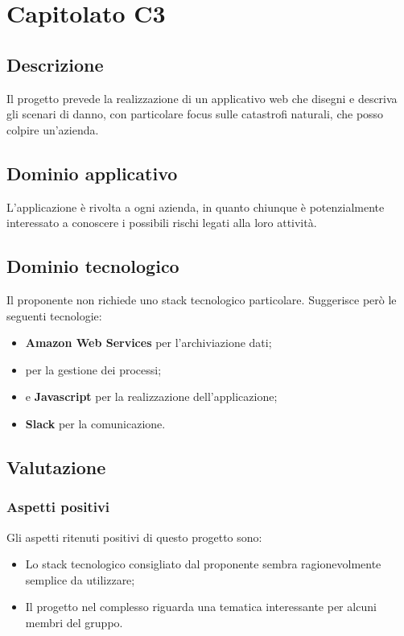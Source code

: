 \documentclass[../StudioDiFattibilita.tex]{subfiles}
\begin{document}
	\section{Capitolato C3}
		\subsection{Descrizione}
			Il progetto prevede la realizzazione di un applicativo web che disegni e descriva gli scenari di danno, con particolare focus sulle catastrofi naturali, che posso colpire un'azienda.
		\subsection{Dominio applicativo}
			L'applicazione è rivolta a ogni azienda, in quanto chiunque è potenzialmente interessato a conoscere i possibili rischi legati alla loro attività.
		\subsection{Dominio tecnologico} %
			Il proponente non richiede uno stack tecnologico particolare. Suggerisce però le seguenti tecnologie:
			\begin{itemize}
				\item \textbf{Amazon Web Services} per l'archiviazione dati;
				\item \textbf{} per la gestione dei processi;
				\item \textbf{} e \textbf{Javascript} per la realizzazione dell'applicazione;
				\item \textbf{Slack} per la comunicazione.
			\end{itemize}
		\subsection{Valutazione}
			\subsubsection{Aspetti positivi}
				Gli aspetti ritenuti positivi di questo progetto sono:
				\begin{itemize}
					\item Lo stack tecnologico consigliato dal proponente sembra ragionevolmente semplice da utilizzare;
					\item Il progetto nel complesso riguarda una tematica interessante per alcuni membri del gruppo.
				\end{itemize}					
\end{document}

